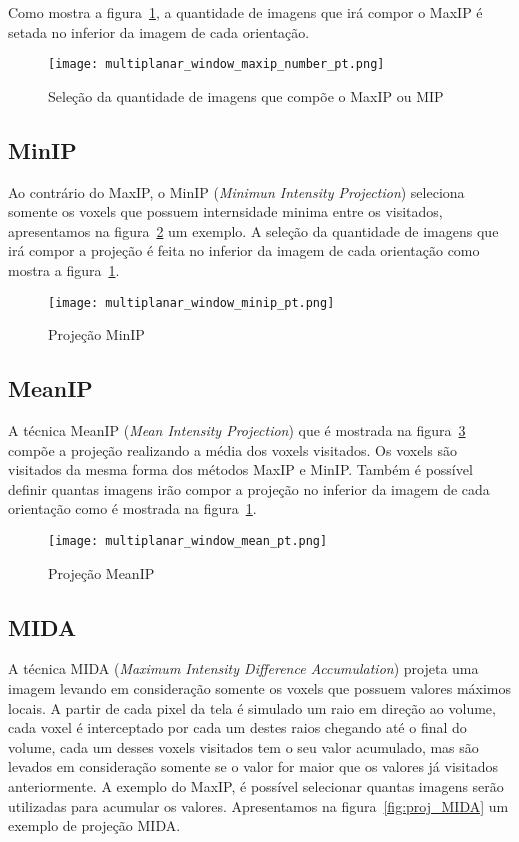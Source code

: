 Como mostra a figura~\ref{fig:proj_maxip_qtd}, a quantidade de imagens que irá compor o MaxIP é setada no inferior da imagem de cada orientação.

\begin{figure}[H]
\centering
\texttt{[image: multiplanar\_window\_maxip\_number\_pt.png]}
\caption{Seleção da quantidade de imagens que compõe o MaxIP ou MIP}
\label{fig:proj_maxip_qtd}
\end{figure}

\subsection{MinIP}

Ao contrário do MaxIP, o MinIP (\textit{Minimun Intensity Projection}) seleciona somente os voxels que possuem internsidade minima entre os visitados, apresentamos na figura~\ref{fig:proj_minIP} um exemplo. A seleção da quantidade de imagens que irá compor a projeção é feita no inferior da imagem de cada orientação como mostra a figura~\ref{fig:proj_maxip_qtd}.

\begin{figure}[H]
\centering
\texttt{[image: multiplanar\_window\_minip\_pt.png]}
\caption{Projeção MinIP}
\label{fig:proj_minIP}
\end{figure}

\subsection{MeanIP}
A técnica MeanIP (\textit{Mean Intensity Projection}) que é mostrada na figura~\ref{fig:proj_meanIP} compõe a projeção realizando a média dos voxels visitados. Os voxels são visitados da mesma forma dos métodos MaxIP e MinIP. Também é possível definir quantas imagens irão compor a projeção no inferior da imagem de cada orientação como é mostrada na figura~\ref{fig:proj_maxip_qtd}.

\begin{figure}[H]
\centering
\texttt{[image: multiplanar\_window\_mean\_pt.png]}
\caption{Projeção MeanIP}
\label{fig:proj_meanIP}
\end{figure}

\subsection{MIDA}
\label{sub:mida}
A técnica MIDA (\textit{Maximum Intensity Difference Accumulation}) projeta uma imagem levando em consideração somente os voxels que possuem valores máximos locais. A partir de cada pixel da tela é simulado um raio em direção ao volume, cada voxel é interceptado por cada um destes raios chegando até o final do volume, cada um desses voxels visitados tem o seu valor acumulado, mas são levados em consideração somente se o valor for maior que os valores já visitados anteriormente. A exemplo do MaxIP, é possível selecionar quantas imagens serão utilizadas para acumular os valores. Apresentamos na figura~\ref{fig:proj_MIDA} um exemplo de projeção MIDA.  

